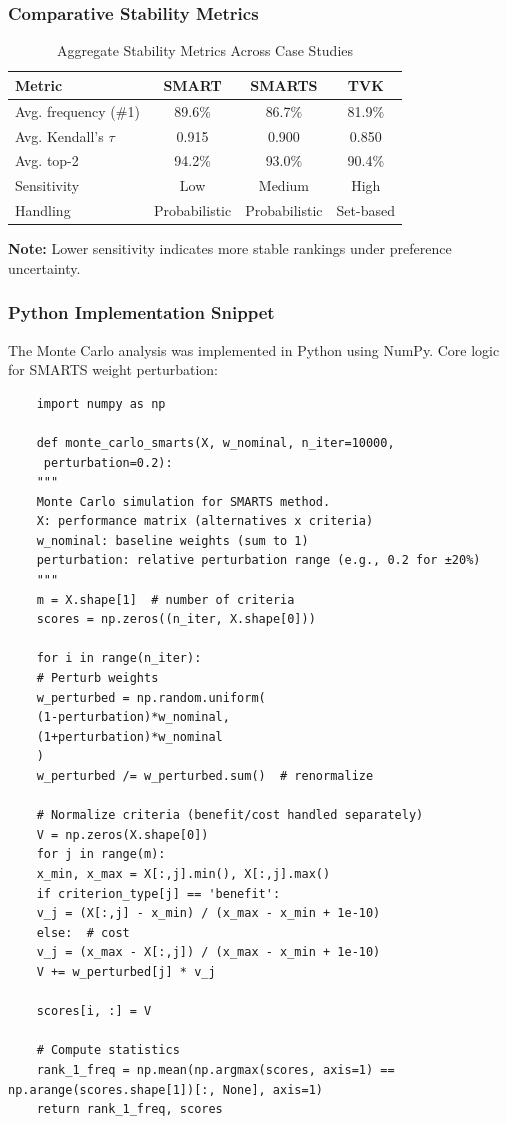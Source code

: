 \documentclass[conference]{IEEEtran}
\begin{document}
\subsubsection{Comparative Stability Metrics}

\begin{table}[H]
	\centering
	\caption{Aggregate Stability Metrics Across Case Studies}
	\label{tab:stability_metrics_simple}
	
	\footnotesize
	\setlength{\tabcolsep}{6pt}
	\renewcommand{\arraystretch}{1.3}
	
	\begin{tabular}{|l|c|c|c|}
		\hline
		\textbf{Metric} & \textbf{SMART} & \textbf{SMARTS} & \textbf{TVK} \\
		\hline
		Avg. frequency (\#1) & 89.6\% & 86.7\% & 81.9\% \\
		Avg. Kendall's $\tau$ & 0.915 & 0.900 & 0.850 \\
		Avg. top-2 & 94.2\% & 93.0\% & 90.4\% \\
		Sensitivity & Low & Medium & High \\
		Handling & Probabilistic & Probabilistic & Set-based \\
		\hline
	\end{tabular}
	
	\vspace{3mm}
	\footnotesize
	\textbf{Note:} Lower sensitivity indicates more stable rankings under preference uncertainty.
\end{table}

\subsubsection{Python Implementation Snippet}

The Monte Carlo analysis was implemented in Python using NumPy. Core logic for SMARTS weight perturbation:

\begin{verbatim}
	import numpy as np
	
	def monte_carlo_smarts(X, w_nominal, n_iter=10000,
	 perturbation=0.2):
	"""
	Monte Carlo simulation for SMARTS method.
	X: performance matrix (alternatives x criteria)
	w_nominal: baseline weights (sum to 1)
	perturbation: relative perturbation range (e.g., 0.2 for ±20%)
	"""
	m = X.shape[1]  # number of criteria
	scores = np.zeros((n_iter, X.shape[0]))
	
	for i in range(n_iter):
	# Perturb weights
	w_perturbed = np.random.uniform(
	(1-perturbation)*w_nominal, 
	(1+perturbation)*w_nominal
	)
	w_perturbed /= w_perturbed.sum()  # renormalize
	
	# Normalize criteria (benefit/cost handled separately)
	V = np.zeros(X.shape[0])
	for j in range(m):
	x_min, x_max = X[:,j].min(), X[:,j].max()
	if criterion_type[j] == 'benefit':
	v_j = (X[:,j] - x_min) / (x_max - x_min + 1e-10)
	else:  # cost
	v_j = (x_max - X[:,j]) / (x_max - x_min + 1e-10)
	V += w_perturbed[j] * v_j
	
	scores[i, :] = V
	
	# Compute statistics
	rank_1_freq = np.mean(np.argmax(scores, axis=1) == np.arange(scores.shape[1])[:, None], axis=1)
	return rank_1_freq, scores
\end{verbatim}
\end{document}

